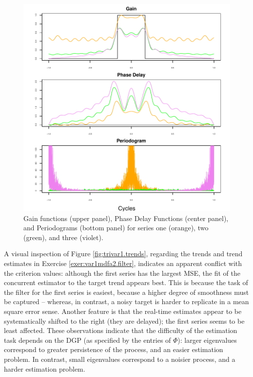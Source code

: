 \documentclass[a4paper]{book}
\begin{document}
\begin{figure}[htb!]
\begin{center}
\includegraphics[]{mdfa_trivar1_freqdomain.pdf}
\caption{Gain functions (upper panel), 
	Phase Delay Functions (center panel), and Periodograms (bottom panel)
	 for series one (orange), two (green), and three (violet).}
\label{fig:trivar1.freqdomain}
\end{center}
\end{figure}

 
A visual inspection of Figure \ref{fig:trivar1.trends}, regarding
the trends and trend estimates in Exercise 
 \ref{exer:var1mdfa2.filter}, indicates an apparent conflict with the 
 criterion values: although the first series has the largest MSE,
 the fit of the concurrent estimator to the target trend appears best.
 This is because the task of the filter for the first series is
 easiest, because a higher degree of smoothness must be captured --
 whereas, in contrast, a noisy target is harder to replicate in a
 mean square error sense. Another feature is that the real-time
 estimates appear  to be systematically 
shifted to the right (they are delayed); the first series seems to be least
 affected.   These observations indicate that the difficulty of the estimation 
  task  depends on the DGP (as specified by the entries of $\Phi$):
 larger eigenvalues correspond to greater persistence of the process, 
  and an easier estimation problem.  In contrast, small eigenvalues 
 correspond to a noisier process, and a harder estimation problem.
 
\end{document}
